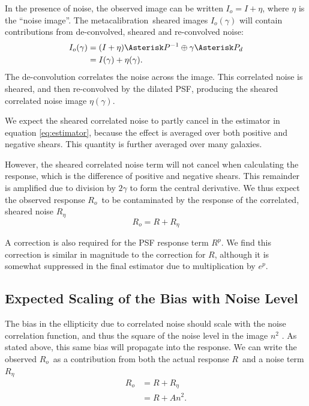 \documentclass[usegraphicx,usenatbib]{mn2e}
\newcommand{\mcal}{metacalibration}
\newcommand{\mcalR}{$R$}
\newcommand{\mcalRpsf}{$R^{p}$}
\newcommand{\mcalRo}{$R_o$}
\newcommand{\mcalRnoise}{$R_\eta$}
\begin{document}
In the presence of noise, the observed image can be written $I_o=I+\eta$, where $\eta$
is the ``noise image''.  The \mcal\ sheared images $I_o(\gamma)$ will contain
contributions from de-convolved, sheared and re-convolved noise:
\begin{align}
    I_{o}(\gamma) &= (I + \eta) \Asterisk P^{-1} \oplus \gamma \Asterisk P_{d} \nonumber \\
    &= I(\gamma) + \eta(\gamma).
\end{align}
The de-convolution correlates the noise
across the image.  This correlated noise is sheared, and then re-convolved by
the dilated PSF, producing the sheared correlated noise image $\eta(\gamma)$.

We expect the sheared correlated noise to partly cancel in the estimator in
equation \ref{eq:estimator}, because the effect is averaged over both positive
and negative shears. This quantity is further averaged over many galaxies.

However, the sheared correlated noise term will not cancel when calculating the
response, which is the difference of positive and negative shears.  This
remainder is amplified due to division by $2 \gamma$ to form the central
derivative.  We thus expect the observed response \mcalRo\ to be contaminated
by the response of the correlated, sheared noise \mcalRnoise\
\begin{equation}
    \mbox{\mcalRo}  =  R + \mbox{\mcalRnoise}
\end{equation}

A correction is also required for the PSF response term \mcalRpsf.  We find
this correction is similar in magnitude to the correction for \mcalR, although
it is somewhat suppressed in the final estimator due to multiplication by $e^p$.

\subsection{Expected Scaling of the Bias with Noise Level} \label{sec:scaling}

The bias in the ellipticity due to correlated noise should scale
with the noise correlation function, and thus the square of the noise level in
the image $n^2$ \citep{HirataCorrNoise}.  As stated above, this same bias will
propagate into the response.  We can write the observed \mcalRo\ as a contribution
from both the actual response \mcalR\ and a noise term \mcalRnoise\
\begin{align} \label{eq:scaling}
    \mbox{\mcalRo} &= R + \mbox{\mcalRnoise}  \nonumber \\
                   &= R + A n^2.
\end{align}
\end{document}

